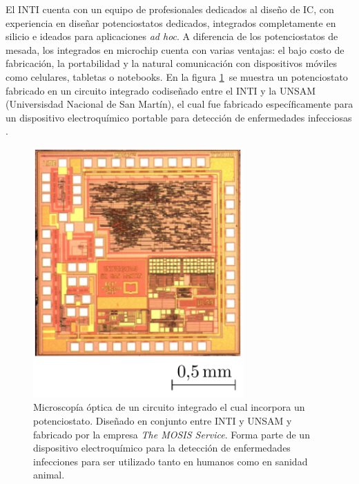 	  El INTI cuenta con un equipo de profesionales dedicados al diseño de IC, con experiencia en diseñar potenciostatos dedicados, integrados completamente en silicio e ideados para aplicaciones \textit{ad hoc}\cite{sanmartin2011}. A diferencia de los potenciostatos de mesada, los integrados en microchip cuenta con varias ventajas: el bajo costo de fabricación, la portabilidad y la natural comunicación con dispositivos móviles como celulares, tabletas o notebooks.\cite{longinotti2010,Salomon2014} En la figura \ref{fig:pote-onchip} se muestra un potenciostato fabricado en un circuito integrado codiseñado entre el INTI y la UNSAM (Universisdad Nacional de San Martín), el cual fue fabricado específicamente para un dispositivo electroquímico portable para detección de enfermedades infecciosas \cite{Kuo2018}.	 
 			
 			\begin{figure}[th!]
			    \begin{center}
			    \includegraphics[width=0.72\textwidth]{Imagenes/potenciostato-chip.pdf}
	       		\caption{Microscopía óptica de un circuito integrado el cual incorpora un potenciostato. Diseñado en conjunto entre INTI y UNSAM y fabricado por la empresa \textit{The MOSIS Service}. Forma parte de un dispositivo electroquímico para la detección de enfermedades infecciones para ser utilizado tanto en humanos como en sanidad animal.}
	         	\label{fig:pote-onchip}
	     		\end{center}
	     		\end{figure}

